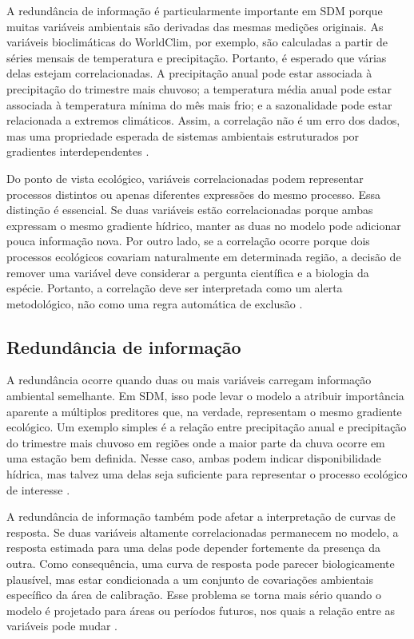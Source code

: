 A redundância de informação é particularmente importante em SDM porque muitas variáveis ambientais são derivadas das mesmas medições originais. As variáveis bioclimáticas do WorldClim, por exemplo, são calculadas a partir de séries mensais de temperatura e precipitação. Portanto, é esperado que várias delas estejam correlacionadas. A precipitação anual pode estar associada à precipitação do trimestre mais chuvoso; a temperatura média anual pode estar associada à temperatura mínima do mês mais frio; e a sazonalidade pode estar relacionada a extremos climáticos. Assim, a correlação não é um erro dos dados, mas uma propriedade esperada de sistemas ambientais estruturados por gradientes interdependentes \parencite{booth2014bioclim,guisan2017habitat}.

Do ponto de vista ecológico, variáveis correlacionadas podem representar processos distintos ou apenas diferentes expressões do mesmo processo. Essa distinção é essencial. Se duas variáveis estão correlacionadas porque ambas expressam o mesmo gradiente hídrico, manter as duas no modelo pode adicionar pouca informação nova. Por outro lado, se a correlação ocorre porque dois processos ecológicos covariam naturalmente em determinada região, a decisão de remover uma variável deve considerar a pergunta científica e a biologia da espécie. Portanto, a correlação deve ser interpretada como um alerta metodológico, não como uma regra automática de exclusão \parencite{elith2009species,zurell2020standard}.

\subsection{Redundância de informação}

A redundância ocorre quando duas ou mais variáveis carregam informação ambiental semelhante. Em SDM, isso pode levar o modelo a atribuir importância aparente a múltiplos preditores que, na verdade, representam o mesmo gradiente ecológico. Um exemplo simples é a relação entre precipitação anual e precipitação do trimestre mais chuvoso em regiões onde a maior parte da chuva ocorre em uma estação bem definida. Nesse caso, ambas podem indicar disponibilidade hídrica, mas talvez uma delas seja suficiente para representar o processo ecológico de interesse \parencite{dormann2013collinearity,franklin2010mapping}.

A redundância de informação também pode afetar a interpretação de curvas de resposta. Se duas variáveis altamente correlacionadas permanecem no modelo, a resposta estimada para uma delas pode depender fortemente da presença da outra. Como consequência, uma curva de resposta pode parecer biologicamente plausível, mas estar condicionada a um conjunto de covariações ambientais específico da área de calibração. Esse problema se torna mais sério quando o modelo é projetado para áreas ou períodos futuros, nos quais a relação entre as variáveis pode mudar \parencite{elith2009species,zurell2020standard}.

